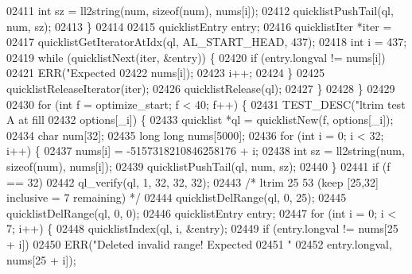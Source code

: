 \begin{DoxyCode}
{{{{{{{{{{{{{{{{{{{{{{{{{{{{{{{{{{{{{{{{{{{{{{{{{{{{{{{{{{{{{{{{{{{{{{{{{{{{{{{{{{{{{{{{{02411                     \textcolor{keywordtype}{int} sz = ll2string(num, \textcolor{keyword}{sizeof}(num), nums[i]);
02412                     quicklistPushTail(ql, num, sz);
02413                 \}
02414 
02415                 quicklistEntry entry;
02416                 quicklistIter *iter =
02417                     quicklistGetIteratorAtIdx(ql, AL\_START\_HEAD, 437);
02418                 \textcolor{keywordtype}{int} i = 437;
02419                 \textcolor{keywordflow}{while} (quicklistNext(iter, &entry)) \{
02420                     \textcolor{keywordflow}{if} (entry.longval != nums[i])
02421                         ERR(\textcolor{stringliteral}{"Expected %
02422                             nums[i]);
02423                     i++;
02424                 \}
02425                 quicklistReleaseIterator(iter);
02426                 quicklistRelease(ql);
02427             \}
02428         \}
02429 
02430         \textcolor{keywordflow}{for} (\textcolor{keywordtype}{int} f = optimize\_start; f < 40; f++) \{
02431             TEST\_DESC(\textcolor{stringliteral}{"ltrim test A at fill %
02432                       options[\_i]) \{
02433                 quicklist *ql = quicklistNew(f, options[\_i]);
02434                 \textcolor{keywordtype}{char} num[32];
02435                 \textcolor{keywordtype}{long} \textcolor{keywordtype}{long} nums[5000];
02436                 \textcolor{keywordflow}{for} (\textcolor{keywordtype}{int} i = 0; i < 32; i++) \{
02437                     nums[i] = -5157318210846258176 + i;
02438                     \textcolor{keywordtype}{int} sz = ll2string(num, \textcolor{keyword}{sizeof}(num), nums[i]);
02439                     quicklistPushTail(ql, num, sz);
02440                 \}
02441                 \textcolor{keywordflow}{if} (f == 32)
02442                     ql\_verify(ql, 1, 32, 32, 32);
02443                 \textcolor{comment}{/* ltrim 25 53 (keep [25,32] inclusive = 7 remaining) */}
02444                 quicklistDelRange(ql, 0, 25);
02445                 quicklistDelRange(ql, 0, 0);
02446                 quicklistEntry entry;
02447                 \textcolor{keywordflow}{for} (\textcolor{keywordtype}{int} i = 0; i < 7; i++) \{
02448                     quicklistIndex(ql, i, &entry);
02449                     \textcolor{keywordflow}{if} (entry.longval != nums[25 + i])
02450                         ERR(\textcolor{stringliteral}{"Deleted invalid range!  Expected %
02451                             \textcolor{stringliteral}{"%
02452                             entry.longval, nums[25 + i]);
}}}}}}}}}}}}}}}}}}}}}}}}}}}}}}}}}}}}}}}}}}}}}}}}}}}}}}}}}}}}}}}}}}}}}}}}}}}}}}}}}}}}}}}}}}}}}
\end{DoxyCode}
